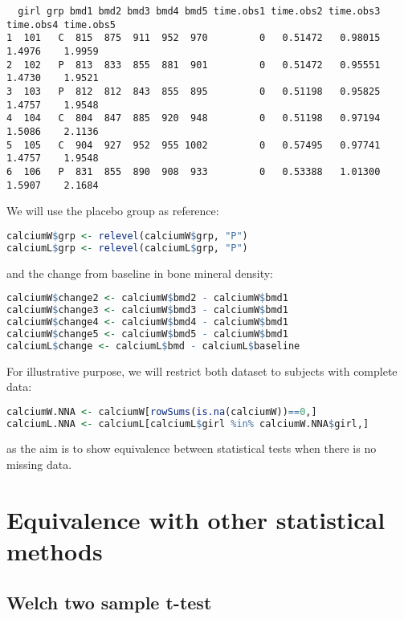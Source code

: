 \documentclass[12pt]{article}
\begin{document}
\label{}
\begin{verbatim}
  girl grp bmd1 bmd2 bmd3 bmd4 bmd5 time.obs1 time.obs2 time.obs3 time.obs4 time.obs5
1  101   C  815  875  911  952  970         0   0.51472   0.98015    1.4976    1.9959
2  102   P  813  833  855  881  901         0   0.51472   0.95551    1.4730    1.9521
3  103   P  812  812  843  855  895         0   0.51198   0.95825    1.4757    1.9548
4  104   C  804  847  885  920  948         0   0.51198   0.97194    1.5086    2.1136
5  105   C  904  927  952  955 1002         0   0.57495   0.97741    1.4757    1.9548
6  106   P  831  855  890  908  933         0   0.53388   1.01300    1.5907    2.1684
\end{verbatim}


We will use the placebo group as reference:
\begin{lstlisting}[language=r,numbers=none]
calciumW$grp <- relevel(calciumW$grp, "P")
calciumL$grp <- relevel(calciumL$grp, "P")
\end{lstlisting}

and the change from baseline in bone mineral density:
\begin{lstlisting}[language=r,numbers=none]
calciumW$change2 <- calciumW$bmd2 - calciumW$bmd1
calciumW$change3 <- calciumW$bmd3 - calciumW$bmd1
calciumW$change4 <- calciumW$bmd4 - calciumW$bmd1
calciumW$change5 <- calciumW$bmd5 - calciumW$bmd1
calciumL$change <- calciumL$bmd - calciumL$baseline
\end{lstlisting}


For illustrative purpose, we will restrict both dataset to subjects
with complete data:
\begin{lstlisting}[language=r,numbers=none]
calciumW.NNA <- calciumW[rowSums(is.na(calciumW))==0,]
calciumL.NNA <- calciumL[calciumL$girl %in% calciumW.NNA$girl,]
\end{lstlisting}

as the aim is to show equivalence between statistical tests when there
is no missing data. 

\clearpage
\section{Equivalence with other statistical methods}
\label{sec:org1fe2417}
\subsection{Welch two sample t-test}
\label{sec:org4e741e4}
\end{document}

